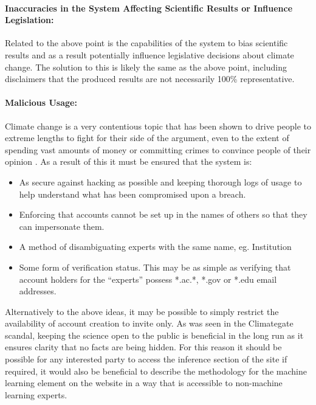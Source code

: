 \documentclass{ecmm427_assignment}
\begin{document}
\paragraph{Inaccuracies in the System Affecting Scientific Results or Influence
Legislation: }

\quad Related to the above point is the capabilities of the system to bias
scientific results and as a result potentially influence legislative
decisions about climate change. The solution to this is likely the
same as the above point, including disclaimers that the produced results
are not necessarily 100\% representative. \\

\paragraph{Malicious Usage:}

\quad Climate change is a very contentious topic that has been shown to
drive people to extreme lengths to fight for their side of the argument,
even to the extent of spending vast amounts of money or committing
crimes to convince people of their opinion \cite{nerlich2010climategate}. As a result
of this it must be ensured that the system is:
\begin{itemize}
\item As secure against hacking as possible and keeping thorough logs of
usage to help understand what has been compromised upon a breach.
\item Enforcing that accounts cannot be set up in the names of others so
that they can impersonate them. 
\item A method of disambiguating experts with the same name, eg. Institution
\item Some form of verification status. This may be as simple as verifying
that account holders for the ``experts'' possess {*}.ac.{*}, {*}.gov
or {*}.edu email addresses. 
\end{itemize}
\quad Alternatively to the above ideas, it may be possible to simply restrict
the availability of account creation to invite only. As was seen in
the Climategate scandal, keeping the science open to the public is
beneficial in the long run as it ensures clarity that no facts are
being hidden. For this reason it should be possible for any interested
party to access the inference section of the site if required, it
would also be beneficial to describe the methodology for the machine learning
element on the website in a way that is accessible to non-machine
learning experts.
\end{document}
